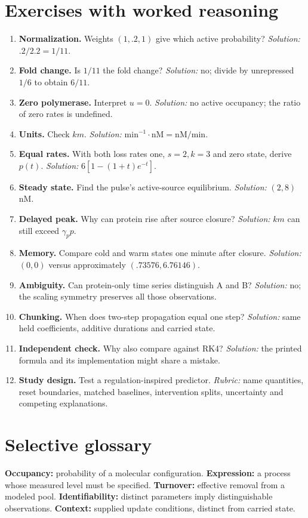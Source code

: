 \section{Exercises with worked reasoning}
\begin{enumerate}
\item \textbf{Normalization.} Weights $(1,.2,1)$ give which active probability?
 \emph{Solution:} $.2/2.2=1/11$.
\item \textbf{Fold change.} Is $1/11$ the fold change?
 \emph{Solution:} no; divide by unrepressed $1/6$ to obtain $6/11$.
\item \textbf{Zero polymerase.} Interpret $u=0$.
 \emph{Solution:} no active occupancy; the ratio of zero rates is undefined.
\item \textbf{Units.} Check $km$.
 \emph{Solution:} $\mathrm{min}^{-1}\cdot\mathrm{nM}=\mathrm{nM/min}$.
\item \textbf{Equal rates.} With both loss rates one, $s=2,k=3$ and zero
 state, derive $p(t)$. \emph{Solution:} $6[1-(1+t)e^{-t}]$.
\item \textbf{Steady state.} Find the pulse's active-source equilibrium.
 \emph{Solution:} $(2,8)$ nM.
\item \textbf{Delayed peak.} Why can protein rise after source closure?
 \emph{Solution:} $km$ can still exceed $\gamma_p p$.
\item \textbf{Memory.} Compare cold and warm states one minute after closure.
 \emph{Solution:} $(0,0)$ versus approximately $(.73576,6.76146)$.
\item \textbf{Ambiguity.} Can protein-only time series distinguish A and B?
 \emph{Solution:} no; the scaling symmetry preserves all those observations.
\item \textbf{Chunking.} When does two-step propagation equal one step?
 \emph{Solution:} same held coefficients, additive durations and carried state.
\item \textbf{Independent check.} Why also compare against RK4?
 \emph{Solution:} the printed formula and its implementation might share a mistake.
\item \textbf{Study design.} Test a regulation-inspired predictor.
 \emph{Rubric:} name quantities, reset boundaries, matched baselines,
 intervention splits, uncertainty and competing explanations.
\end{enumerate}
\section*{Selective glossary}
\textbf{Occupancy:} probability of a molecular configuration.
\textbf{Expression:} a process whose measured level must be specified.
\textbf{Turnover:} effective removal from a modeled pool.
\textbf{Identifiability:} distinct parameters imply distinguishable observations.
\textbf{Context:} supplied update conditions, distinct from carried state.
